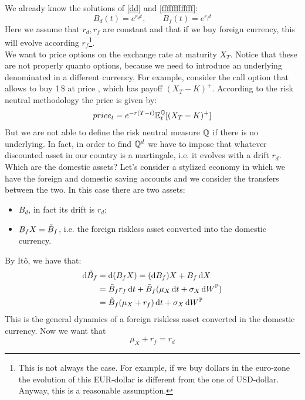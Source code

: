 We already know the solutions of \eqref{dd} and \eqref{fffffffffffff}:
\begin{equation}
    B_d(t) = e^{r_d t}, \qquad B_f(t) = e^{r_f t}
\end{equation}
Here we assume that $r_d, r_f$ are constant and that if we buy foreign currency, this will evolve according $r_f$\footnote{This is not always the case. For example, if we buy dollars in the euro-zone the evolution of this EUR-dollar is different from the one of USD-dollar. Anyway, this is a reasonable assumption.}. \\
We want to price options on the exchange rate at maturity $X_T$. Notice that these are not properly quanto options, because we need to introduce an underlying denominated in a different currency. For example, consider the call option that allows to buy 1\,\$ at price , which has payoff $(X_T-K)^+$. According to the risk neutral methodology the price is given by:
\begin{align*}
    price_t = e^{-r(T-t)}\mathbb{E}^{\mathbb{Q}}_t[(X_T-K)^+]
\end{align*}
But we are not able to define the risk neutral measure $\mathbb{Q}$ if there is no underlying. In fact, in order to find $\mathbb{Q}^d$ we have to impose that whatever discounted asset in our country is a martingale, i.e. it evolves with a drift $r_d$. \\
Which are the domestic assets? Let's consider a stylized economy in which we have the foreign and domestic saving accounts and we consider the transfers between the two. In this case there are two assets:
\begin{itemize}
    \item $B_d$, in fact its drift is $r_d$;
    \item $B_fX = \Tilde{B}_f$, i.e. the foreign riskless asset converted into the domestic currency.
\end{itemize}
By Itô, we have that:
\begin{align}\label{al1}
    \notag\dd\Tilde{B}_f &= \dd(B_fX) = (\dd B_f)X + B_f\,\dd X \\
    &=
    \notag\Tilde{B}_f r_f\, \dd t + \Tilde{B}_f(\mu_X\,\dd t + \sigma_X\,\dd W^{\mathbb{P}}) \\
    &=
    \Tilde{B}_f(\mu_X + r_f)\,\dd t + \sigma_X\,\dd W^{\mathbb{P}}
\end{align}
This is the general dynamics of a foreign riskless asset converted in the domestic currency. Now we want that
\begin{equation*}
    \mu_X + r_f = r_d
\end{equation*}
